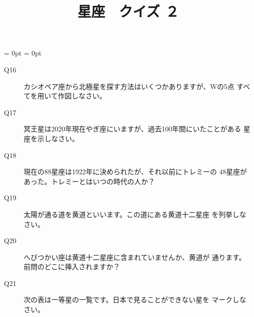 \documentclass[fleqn]{article}
\begin{document}
\title{星座　クイズ ２　}
\maketitle
\hoffset = 0pt
\voffset = 0pt
\topmargin=0pt
\textheight=21cm
\headheight=0pt
\headsep=0pt
\newcommand{\CHo}{\makebox(0,0){$\bullet$}}
\newcommand{\CHc}{\makebox(0,0){$\circ$}}
\newcommand{\CHb}{\makebox(0,0){$\bigcirc$}}


\renewcommand{\descriptionlabel}[1]
{\hspace{\labelsep}\textsf{#1}}
\begin{description}


\item[Q16]{カシオペア座から北極星を探す方法はいくつかありますが、Wの5点
すべてを用いて作図しなさい。
}
\item[Q17]{冥王星は2020年現在やぎ座にいますが、過去100年間にいたことがある
星座を示しなさい。
}

\item[Q18]{現在の88星座は1922年に決められたが、それ以前にトレミーの
48星座があった。トレミーとはいつの時代の人か？
}
\item[Q19]{太陽が通る道を黄道といいます。この道にある黄道十二星座
を列挙しなさい。
}

\item[Q20]{へびつかい座は黄道十二星座に含まれていませんか、黄道が
通ります。前問のどこに挿入されますか？
}
\item[Q21]{次の表は一等星の一覧です。日本で見ることができない星を
マークしなさい。\\



}
\end{description}
\end{document}
